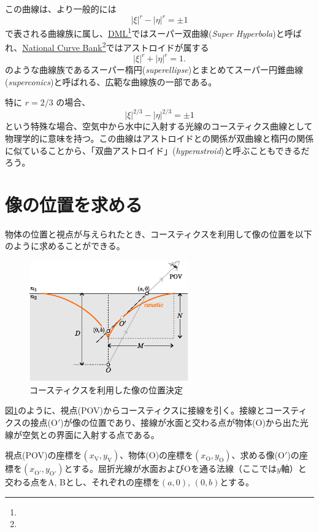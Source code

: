 \documentclass[twocolumn]{article}
\begin{document}
この曲線は、より一般的には
$$ \left| \xi \right|^{r} - \left| \eta \right|^{r} = \pm1 $$
で表される曲線族に属し、\href{http://dynamicmathematicslearning.com/super-ellipse.html}{DML}\footnote{}ではスーパー双曲線(\emph{Super Hyperbola})と呼ばれ、\href{https://old.nationalcurvebank.org/superconicncb/superconicncb.htm}{National Curve Bank}\footnote{}ではアストロイドが属する
$$ \left| \xi \right|^{r} + \left| \eta \right|^{r} = 1. $$
のような曲線族であるスーパー楕円(\emph{superellipse})とまとめてスーパー円錐曲線(\emph{superconics})と呼ばれる、広範な曲線族の一部である。

特に $r = 2/3$ の場合、
$$ \left| \xi \right|^{2/3} - \left| \eta \right|^{2/3} = \pm1 $$
という特殊な場合、空気中から水中に入射する光線のコースティクス曲線として物理学的に意味を持つ。この曲線はアストロイドとの関係が双曲線と楕円の関係に似ていることから、「双曲アストロイド」(\emph{hyperastroid})と呼ぶこともできるだろう。
	
\section{像の位置を求める}

物体の位置と視点が与えられたとき、コースティクスを利用して像の位置を以下のように求めることができる。

\begin{figure}[!h]
	\centering
	\includegraphics[width=2.7in]{figs/g394.eps}
	\caption{コースティクスを利用した像の位置決定}
	\label{fig:image_caustic}
\end{figure}

図\ref{fig:image_caustic}のように、視点(POV)からコースティクスに接線を引く。接線とコースティクスの接点($\mathrm{O'}$)が像の位置であり、接線が水面と交わる点が物体($\mathrm{O}$)から出た光線が空気との界面に入射する点である。

視点(POV)の座標を$(x_{\mathrm{V}}^{}, y_{\mathrm{V}}^{})$、物体($\mathrm{O}$)の座標を$(x_{\mathrm{O}}^{}, y_{\mathrm{O}}^{})$、求める像($\mathrm{O'}$)の座標を$(x_{\mathrm{O'}}^{}, y_{\mathrm{O'}}^{})$とする。屈折光線が水面および$\mathrm{O}$を通る法線（ここでは$y$軸）と交わる点をA, Bとし、それぞれの座標を$(a, 0)$, $(0, b)$とする。
\end{document}
